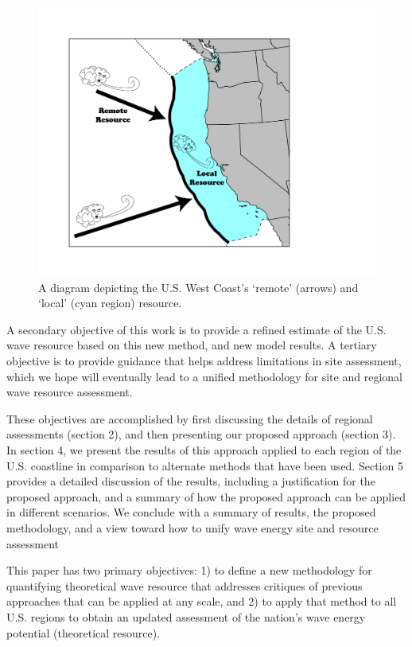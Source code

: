 \begin{figure}[ht]
  \centering
\includegraphics[width=0.9\linewidth]{../diagram/EEZ_contour03_edit01.png}
  \caption{A diagram depicting the U.S. West Coast’s ‘remote’ (arrows) and ‘local’ (cyan region) resource.}
  \label{fig:map01}
\end{figure}

A secondary objective of this work is to provide a refined estimate of the U.S. wave resource based on this new method, and new model results. A tertiary objective is to provide guidance that helps address limitations in site assessment, which we hope will eventually lead to a unified methodology for site and regional wave resource assessment.

These objectives are accomplished by first discussing the details of regional assessments (section 2), and then presenting our proposed approach (section 3). In section 4, we present the results of this approach applied to each region of the U.S. coastline in comparison to alternate methods that have been used. Section 5 provides a detailed discussion of the results, including a justification for the proposed approach, and a summary of how the proposed approach can be applied in different scenarios. We conclude with a summary of results, the proposed methodology, and a view toward how to unify wave energy site and resource assessment

This paper has two primary objectives: 1) to define a new methodology for quantifying theoretical wave resource that addresses critiques of previous approaches that can be applied at any scale, and 2) to apply that method to all U.S. regions to obtain an updated assessment of the nation's wave energy potential (theoretical resource).

